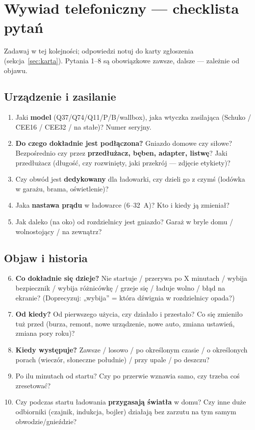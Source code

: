 \documentclass[11pt]{article}
\newcommand{\key}[1]{\textbf{\color{navy}#1}}
\begin{document}
\section{Wywiad telefoniczny — checklista pytań}\label{sec:wywiad}
Zadawaj w tej kolejności; odpowiedzi notuj do karty zgłoszenia (sekcja~\ref{sec:karta}). Pytania 1--8 są obowiązkowe zawsze, dalsze — zależnie od objawu.

\subsection{Urządzenie i zasilanie}
\begin{enumerate}
\item Jaki \key{model} (Q37/Q74/Q11/P/B/wallbox), jaka wtyczka zasilająca (Schuko / CEE16 / CEE32 / na stałe)? Numer seryjny.
\item \key{Do czego dokładnie jest podłączona?} Gniazdo domowe czy siłowe? Bezpośrednio czy przez \key{przedłużacz, bęben, adapter, listwę}? Jaki przedłużacz (długość, czy rozwinięty, jaki przekrój — zdjęcie etykiety)?
\item Czy obwód jest \key{dedykowany} dla ładowarki, czy dzieli go z czymś (lodówka w garażu, brama, oświetlenie)?
\item Jaka \key{nastawa prądu} w ładowarce (6--32~A)? Kto i kiedy ją zmieniał?
\item Jak daleko (na oko) od rozdzielnicy jest gniazdo? Garaż w bryle domu / wolnostojący / na zewnątrz?
\end{enumerate}

\subsection{Objaw i historia}
\begin{enumerate}\setcounter{enumi}{5}
\item \key{Co dokładnie się dzieje?} Nie startuje / przerywa po X minutach / wybija bezpiecznik / wybija różnicówkę / grzeje się / ładuje wolno / błąd na ekranie? (Doprecyzuj: „wybija'' = która dźwignia w rozdzielnicy opada?)
\item \key{Od kiedy?} Od pierwszego użycia, czy działało i przestało? Co się zmieniło tuż przed (burza, remont, nowe urządzenie, nowe auto, zmiana ustawień, zmiana pory roku)?
\item \key{Kiedy występuje?} Zawsze / losowo / po określonym czasie / o określonych porach (wieczór, słoneczne południe) / przy upale / po deszczu?
\item Po ilu minutach od startu? Czy po przerwie wznawia samo, czy trzeba coś zresetować?
\item Czy podczas startu ładowania \key{przygasają światła} w domu? Czy inne duże odbiorniki (czajnik, indukcja, bojler) działają bez zarzutu na tym samym obwodzie/gnieździe?
\end{enumerate}
\end{document}
